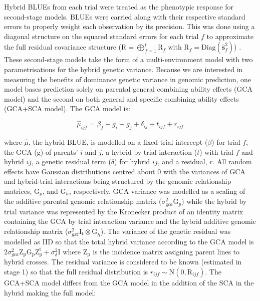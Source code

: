 Hybrid BLUEs from each trial were treated as the phenotypic response for second-stage models. BLUEs were carried along with their respective standard errors to properly weight each observation by its precision. This was done using a diagonal structure on the squared standard errors for each trial \(f\) to approximate the full residual covariance structure (\(\mathrm{R} = \bigoplus_{f=1}^{t} \mathrm{R}_f\) with \(\mathrm{R}_f = \mathrm{Diag}(\hat{\mathbf{s}}_f^2)\)) \parencite{Frensham1997, Mohring2009}. These second-stage models take the form of a multi-environment model with two parametrisations for the hybrid genetic variance. Because we are interested in measuring the benefits of dominance genetic variance in genomic prediction, one model bases prediction solely on parental general combining ability effects (GCA model) and the second on both general and specific combining ability effects (GCA+SCA model). The GCA model is:

\begin{equation}
 \hat{\mu}_{ijf} =  \beta_f + g_i+g_j+\delta_{ij}+t_{ijf}+r_{ijf}
\label{eq:gca}
\end{equation}

where \(\hat{\mu}\), the hybrid BLUE, is modelled on a fixed trial intercept (\(\beta\)) for trial \(f\), the GCA (g) of parents' \(i\) and \(j\), a hybrid by trial interaction (\(t\)) with trial \(f\) and hybrid \(ij\), a genetic residual term (\(\delta\)) for hybrid \(ij\), and a residual, \(r\). All random effects have Gaussian distributions centred about 0 with the variances of GCA and hybrid-trial interactions being structured by the genomic relationship matrices, \(\mathrm G_p\), and \(\mathrm G_h\), respectively. GCA variance was modelled as a scaling of the additive parental genomic relationship matrix (\(\sigma^2_{\mathrm gca}\mathrm{G}_p\)) while the hybrid by trial variance was represented by the Kronecker product of an identity matrix containing the GCA by trial interaction variance and the hybrid additive genomic relationship matrix (\(\sigma^2_{gxt} \mathrm{I_t \otimes G}_h\)). The variance of the genetic residual was modelled as IID so that the total hybrid variance according to the GCA model is \(2\sigma^2_{gca} \mathrm {Z_pG_pZ^t_p} +\sigma^2_{\delta}\mathrm I\) where \(\mathrm{Z_p}\) is the incidence matrix assigning parent lines to hybrid crosses. The residual variance is considered to be known (estimated in stage 1) so that the full residual distribution is \(r_{ijf}\sim\mathrm{N}(0,\mathrm R_{ijf})\). The GCA+SCA model differs from the GCA model in the addition of the SCA in the hybrid making the full model:

